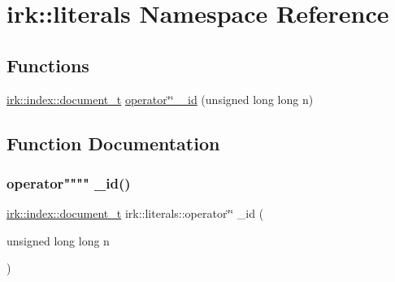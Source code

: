 \hypertarget{namespaceirk_1_1literals}{}\section{irk\+:\+:literals Namespace Reference}
\label{namespaceirk_1_1literals}
\subsection*{Functions}
\begin{DoxyCompactItemize}
\item 
\mbox{\hyperlink{namespaceirk_1_1index_af829dedea20da89f9b51b49d78f57006}{irk\+::index\+::document\+\_\+t}} \mbox{\hyperlink{namespaceirk_1_1literals_ad9947d1794d363cbbcb7dc3c9d5eec20}{operator\char`\"{}\char`\"{} \+\_\+id}} (unsigned long long n)
\end{DoxyCompactItemize}


\subsection{Function Documentation}
\mbox{\label{namespaceirk_1_1literals_ad9947d1794d363cbbcb7dc3c9d5eec20}} 
\subsubsection{\texorpdfstring{operator"""" \+\_\+id()}{operator"" \_id()}}
{\footnotesize\ttfamily \mbox{\hyperlink{namespaceirk_1_1index_af829dedea20da89f9b51b49d78f57006}{irk\+::index\+::document\+\_\+t}} irk\+::literals\+::operator\char`\"{}\char`\"{} \+\_\+id (\begin{DoxyParamCaption}\item[{unsigned long long}]{n }\end{DoxyParamCaption})\hspace{0.3cm}{\ttfamily [inline]}}

